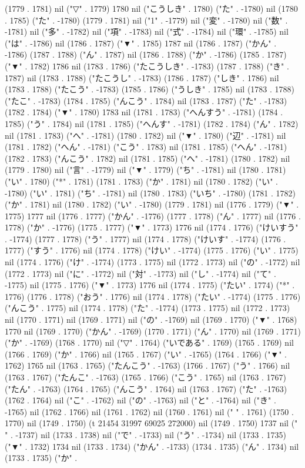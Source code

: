(1779 . 1781) nil ("▽" . 1779) 1780 nil ("こうしき" . 1780) ("た" . -1780) nil (1780 . 1785) ("た" . -1780) (1779 . 1781) nil ("1" . -1779) nil ("変" . -1780) nil ("数" . -1781) nil ("多" . -1782) nil ("項" . -1783) nil ("式" . -1784) nil ("環" . -1785) nil ("は" . -1786) nil (1786 . 1787) ("▼" . 1785) 1787 nil (1786 . 1787) ("かん" . -1786) (1787 . 1788) ("ん" . 1787) nil (1786 . 1788) ("か" . -1786) (1785 . 1787) ("▼" . 1782) 1786 nil (1783 . 1786) ("たこうしき" . -1783) (1787 . 1788) ("き" . 1787) nil (1783 . 1788) ("たこうし" . -1783) (1786 . 1787) ("しき" . 1786) nil (1783 . 1788) ("たこう" . -1783) (1785 . 1786) ("うしき" . 1785) nil (1783 . 1788) ("たこ" . -1783) (1784 . 1785) ("んこう" . 1784) nil (1783 . 1787) ("た" . -1783) (1782 . 1784) ("▼" . 1780) 1783 nil (1781 . 1783) ("へんすう" . -1781) (1784 . 1785) ("う" . 1784) nil (1781 . 1785) ("へんす" . -1781) (1782 . 1784) ("ん" . 1782) nil (1781 . 1783) ("へ" . -1781) (1780 . 1782) nil ("▼" . 1780) ("辺" . -1781) nil (1781 . 1782) ("へん" . -1781) ("こう" . 1783) nil (1781 . 1785) ("へん" . -1781) (1782 . 1783) ("んこう" . 1782) nil (1781 . 1785) ("へ" . -1781) (1780 . 1782) nil (1779 . 1780) nil ("言" . -1779) nil ("▼" . 1779) ("ち" . -1781) nil (1780 . 1781) ("い" . 1780) ("*" . 1781) (1781 . 1783) ("か" . 1781) nil (1780 . 1782) ("い" . -1780) ("い" . 1781) ("ち" . -1781) nil (1780 . 1783) ("いち" . -1780) (1781 . 1782) ("か" . 1781) nil (1780 . 1782) ("い" . -1780) (1779 . 1781) nil (1776 . 1779) ("▼" . 1775) 1777 nil (1776 . 1777) ("かん" . -1776) (1777 . 1778) ("ん" . 1777) nil (1776 . 1778) ("か" . -1776) (1775 . 1777) ("▼" . 1773) 1776 nil (1774 . 1776) ("けいすう" . -1774) (1777 . 1778) ("う" . 1777) nil (1774 . 1778) ("けいす" . -1774) (1776 . 1777) ("すう" . 1776) nil (1774 . 1778) ("けい" . -1774) (1775 . 1776) ("い" . 1775) nil (1774 . 1776) ("け" . -1774) (1773 . 1775) nil (1772 . 1773) nil ("の" . -1772) nil (1772 . 1773) nil ("に" . -1772) nil ("対" . -1773) nil ("し" . -1774) nil ("て" . -1775) nil (1775 . 1776) ("▼" . 1773) 1776 nil (1774 . 1775) ("たい" . 1774) ("*" . 1776) (1776 . 1778) ("おう" . 1776) nil (1774 . 1778) ("たい" . -1774) (1775 . 1776) ("んこう" . 1775) nil (1774 . 1778) ("た" . -1774) (1773 . 1775) nil (1772 . 1773) nil (1770 . 1771) nil (1769 . 1771) nil ("の" . -1769) nil (1769 . 1770) ("▼" . 1768) 1770 nil (1769 . 1770) ("かん" . -1769) (1770 . 1771) ("ん" . 1770) nil (1769 . 1771) ("か" . -1769) (1768 . 1770) nil ("▽" . 1764) ("いである" . 1769) (1765 . 1769) nil (1766 . 1769) ("か" . 1766) nil (1765 . 1767) ("い" . -1765) (1764 . 1766) ("▼" . 1762) 1765 nil (1763 . 1765) ("たんこう" . -1763) (1766 . 1767) ("う" . 1766) nil (1763 . 1767) ("たんこ" . -1763) (1765 . 1766) ("こう" . 1765) nil (1763 . 1767) ("たん" . -1763) (1764 . 1765) ("んこう" . 1764) nil (1763 . 1767) ("た" . -1763) (1762 . 1764) nil ("こ" . -1762) nil ("の" . -1763) nil ("と" . -1764) nil ("き" . -1765) nil (1762 . 1766) nil (1761 . 1762) nil (1760 . 1761) nil (" " . 1761) (1750 . 1770) nil (1749 . 1750) (t 21454 31997 69025 272000) nil (1749 . 1750) 1737 nil (" " . -1737) nil (1733 . 1738) nil ("で" . -1733) nil ("う" . -1734) nil (1733 . 1735) ("▼" . 1732) 1734 nil (1733 . 1734) ("かん" . -1733) (1734 . 1735) ("ん" . 1734) nil (1733 . 1735) ("か" . 